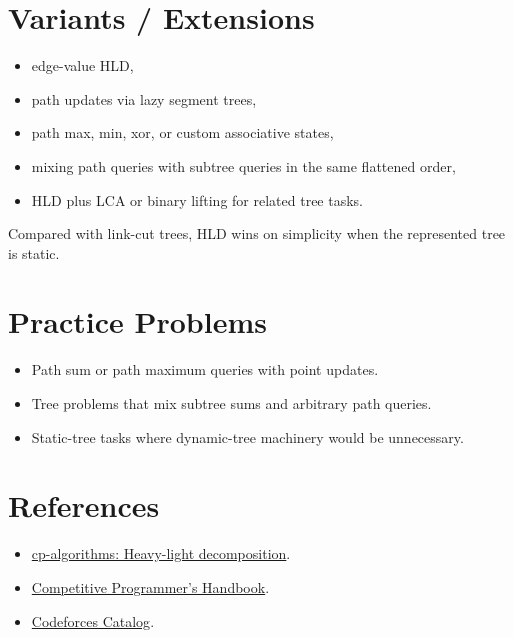 \section*{Variants / Extensions}

\begin{itemize}
  \item edge-value HLD,
  \item path updates via lazy segment trees,
  \item path max, min, xor, or custom associative states,
  \item mixing path queries with subtree queries in the same flattened order,
  \item HLD plus LCA or binary lifting for related tree tasks.
\end{itemize}

Compared with link-cut trees, HLD wins on simplicity when the represented tree is static.

\section*{Practice Problems}

\begin{itemize}
  \item Path sum or path maximum queries with point updates.
  \item Tree problems that mix subtree sums and arbitrary path queries.
  \item Static-tree tasks where dynamic-tree machinery would be unnecessary.
\end{itemize}

\section*{References}

\begin{itemize}
  \item \href{https://cp-algorithms.com/graph/hld.html}{cp-algorithms: Heavy-light decomposition}.
  \item \href{https://usaco.guide/CPH.pdf}{Competitive Programmer's Handbook}.
  \item \href{https://codeforces.com/catalog}{Codeforces Catalog}.
\end{itemize}
